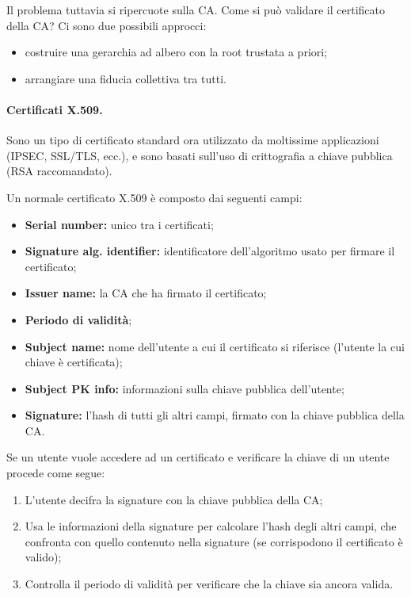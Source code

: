 \documentclass[a4paper, 11pt, twoside]{article}
\begin{document}
    Il problema tuttavia si ripercuote sulla CA. Come si può validare il certificato della CA? Ci sono due possibili approcci: \begin{itemize}
        \item costruire una gerarchia ad albero con la root trustata a priori;
        \item arrangiare una fiducia collettiva tra tutti.
    \end{itemize}

    \paragraph{Certificati X.509.} Sono un tipo di certificato standard ora utilizzato da moltissime applicazioni (IPSEC, SSL/TLS, ecc.), e sono basati sull'uso di crittografia a chiave pubblica (RSA raccomandato).

    Un normale certificato X.509 è composto dai seguenti campi: \begin{itemize}
        \item \textbf{Serial number:} unico tra i certificati;
        \item \textbf{Signature alg. identifier:} identificatore dell'algoritmo usato per firmare il certificato;
        \item \textbf{Issuer name:} la CA che ha firmato il certificato;
        \item \textbf{Periodo di validità};
        \item \textbf{Subject name:} nome dell'utente a cui il certificato si riferisce (l'utente la cui chiave è certificata);
        \item \textbf{Subject PK info:} informazioni sulla chiave pubblica dell'utente;
        \item \textbf{Signature:} l'hash di tutti gli altri campi, firmato con la chiave pubblica della CA.
    \end{itemize}

    Se un utente vuole accedere ad un certificato e verificare la chiave di un utente procede come segue:
    \begin{enumerate}
        \item L'utente decifra la signature con la chiave pubblica della CA;
        \item Usa le informazioni della signature per calcolare l'hash degli altri campi, che confronta con quello contenuto nella signature (se corrispodono il certificato è valido);
        \item Controlla il periodo di validità per verificare che la chiave sia ancora valida.
    \end{enumerate}
\end{document}
